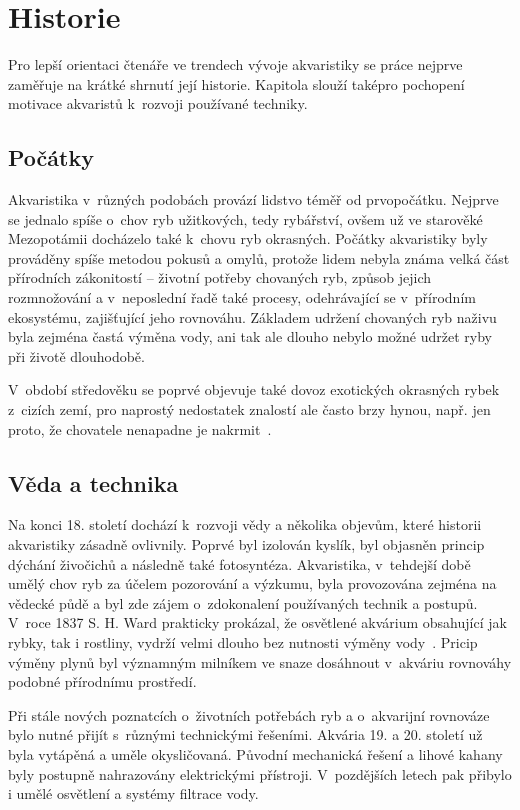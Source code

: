 \section{Historie}
    Pro lepší orientaci čtenáře ve trendech vývoje akvaristiky se práce nejprve zaměřuje na krátké shrnutí její historie. Kapitola slouží taképro pochopení motivace akvaristů k~rozvoji používané techniky.
\subsection{Počátky}
Akvaristika v~různých podobách provází lidstvo téměř od prvopočátku. Nejprve se jednalo spíše o~chov ryb užitkových, tedy rybářství, ovšem už ve starověké Mezopotámii docházelo také k~chovu ryb okrasných. Počátky akvaristiky byly prováděny spíše metodou pokusů a omylů, protože lidem nebyla známa velká část přírodních zákonitostí -- životní potřeby chovaných ryb, způsob jejich rozmnožování a v~neposlední řadě také procesy, odehrávající se v~přírodním ekosystému, zajišťující jeho rovnováhu. Základem udržení chovaných ryb naživu byla zejména častá výměna vody, ani tak ale dlouho nebylo možné udržet ryby při životě dlouhodobě. 

V~období středověku se poprvé objevuje také dovoz exotických okrasných rybek z~cizích zemí, pro naprostý nedostatek znalostí ale často brzy hynou, např. jen proto, že chovatele nenapadne je nakrmit~\cite{vitek_akvaristika}.

\subsection{Věda a technika}
Na konci 18. století dochází k~rozvoji vědy a několika objevům, které historii akvaristiky zásadně ovlivnily. Poprvé byl izolován kyslík, byl objasněn princip dýchání živočichů a následně také fotosyntéza. Akvaristika, v~tehdejší době umělý chov ryb za účelem pozorování a výzkumu, byla provozována zejména na vědecké půdě a byl zde zájem o~zdokonalení používaných technik a postupů. V~roce 1837 S. H. Ward prakticky prokázal, že osvětlené akvárium obsahující jak rybky, tak i rostliny, vydrží velmi dlouho bez nutnosti výměny vody~\cite{vitek_akvaristika}. Pricip výměny plynů byl významným milníkem ve snaze dosáhnout v~akváriu rovnováhy podobné přírodnímu prostředí. 

Při stále nových poznatcích o~životních potřebách ryb a o~akvarijní rovnováze bylo nutné přijít s~různými technickými řešeními. Akvária 19. a 20. století už byla vytápěná a uměle okysličovaná. Původní mechanická řešení a lihové kahany byly postupně nahrazovány elektrickými přístroji. V~pozdějších letech pak přibylo i umělé osvětlení a systémy filtrace vody. 